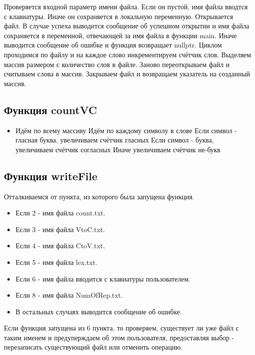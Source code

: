 \documentclass[12pt,a4paper]{article}  %
\begin{document}
Проверяется входной параметр имени файла. Если он пустой, имя файла вводтся с клавиатуры. Иначе он сохраняется в локальную переменную. Открывается файл. В случае успеха выводится сообщение об успешном открытии и имя файла сохраняется в переменной, отвечающей за имя файла в функции main. Иначе выводится сообщение об ошибке и функция возвращает nullptr. Циклом проходимся по файлу и на каждое слово инкрементируем счётчик слов. Выделяем массив размером с количество слов в файле. Заново переоткрываем файл и считываем слова в массив. Закрываем файл и возвращаем указатель на созданный массив.

\subsection*{Функция countVC}

\begin{itemize}
	\item Идём по всему массиву
	\subitem Идём по каждому символу в слове
	\subsubitem Если символ - гласная буква, увеличиваем счётчик гласных
	\subsubitem Если символ - буква, увеличиваем счётчик согласных
	\subsubitem Иначе увеличиваем счётчик не-букв
\end{itemize}

\subsection*{Функция writeFile}

Отталкиваемся от пункта, из которого была запущена функция.

\begin{itemize}
\item Если 2 - имя файла count.txt.
\item Если 3 - имя файла VtoC.txt.
\item Если 4 - имя файла CtoV.txt.
\item Если 5 - имя файла lex.txt.
\item Если 6 - имя файла вводится с клавиатуры пользователем.
\item Если 8 - имя файла NumOfRep.txt.
\item В остальных случаях выводится сообщение об ошибке.
\end{itemize}

Если функция запущена из 6 пункта, то проверяем, существует ли уже файл с таким именем и предуперждаем об этом пользователя, предоставляя выбор - перезаписать существующий файл или отменить операцию.
\end{document}
